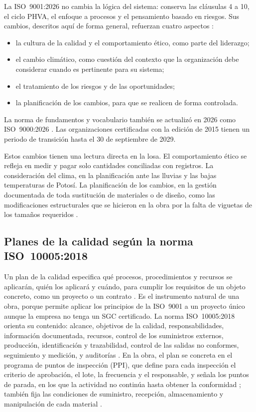 La ISO~9001:2026 no cambia la lógica del sistema: conserva las cláusulas 4 a 10, el ciclo PHVA, el enfoque a procesos y el pensamiento basado en riesgos. Sus cambios, descritos aquí de forma general, refuerzan cuatro aspectos \parencite{iso9001_2026}:
\begin{itemize}
  \item la cultura de la calidad y el comportamiento ético, como parte del liderazgo;
  \item el cambio climático, como cuestión del contexto que la organización debe considerar cuando es pertinente para su sistema;
  \item el tratamiento de los riesgos y de las oportunidades;
  \item la planificación de los cambios, para que se realicen de forma controlada.
\end{itemize}
La norma de fundamentos y vocabulario también se actualizó en 2026 como ISO~9000:2026 \parencite{iso9000_2026}. Las organizaciones certificadas con la edición de 2015 tienen un periodo de transición hasta el 30 de septiembre de 2029. 

Estos cambios tienen una lectura directa en la losa. El comportamiento ético se refleja en medir y pagar solo cantidades conciliadas con registros. La consideración del clima, en la planificación ante las lluvias y las bajas temperaturas de Potosí. La planificación de los cambios, en la gestión documentada de toda sustitución de materiales o de diseño, como las modificaciones estructurales que se hicieron en la obra por la falta de viguetas de los tamaños requeridos \parencite[p.~11]{uatf2025pao2}.

\subsection{Planes de la calidad según la norma ISO~10005:2018}

Un plan de la calidad especifica qué procesos, procedimientos y recursos se aplicarán, quién los aplicará y cuándo, para cumplir los requisitos de un objeto concreto, como un proyecto o un contrato \parencite{iso10005_2018}. Es el instrumento natural de una obra, porque permite aplicar los principios de la ISO~9001 a un proyecto único aunque la empresa no tenga un SGC certificado. La norma ISO~10005:2018 orienta su contenido: alcance, objetivos de la calidad, responsabilidades, información documentada, recursos, control de los suministros externos, producción, identificación y trazabilidad, control de las salidas no conformes, seguimiento y medición, y auditorías \parencite{iso10005_2018}. En la obra, el plan se concreta en el programa de puntos de inspección (PPI), que define para cada inspección el criterio de aprobación, el lote, la frecuencia y el responsable, y señala los puntos de parada, en los que la actividad no continúa hasta obtener la conformidad \parencite[anexo~4]{muro2020}; también fija las condiciones de suministro, recepción, almacenamiento y manipulación de cada material \parencite[p.~83]{cepeda2017}.

